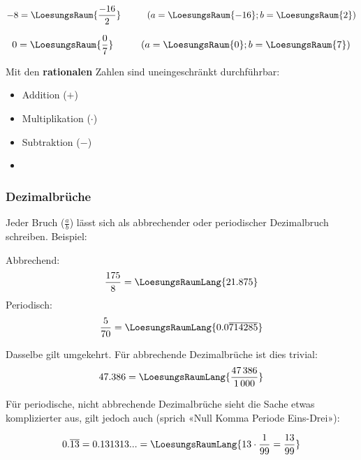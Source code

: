 $$-8 = \LoesungsRaum{\frac{-16}{2}} \hspace{1cm} (a=\LoesungsRaum{-16}; b=\LoesungsRaum{2})$$

$$0 = \LoesungsRaum{\frac{0}{7}} \hspace{1cm} (a=\LoesungsRaum{0}; b=\LoesungsRaum{7})$$


Mit den \textbf{rationalen} Zahlen sind uneingeschränkt durchführbar:
\begin{itemize}
\item Addition ($+$)
\item Multiplikation ($\cdot$)
\item Subtraktion ($-$)
\item {}
\end{itemize}

\newpage


\subsubsection{Dezimalbrüche}
Jeder Bruch ($\frac{a}{b}$) lässt sich als
abbrechender oder periodischer Dezimalbruch schreiben. Beispiel:

Abbrechend:
$$\frac{175}{8} = \LoesungsRaumLang{21.875}$$
Periodisch:
$$\frac{5}{70} = \LoesungsRaumLang{0.0\overline{714285}}$$

Dasselbe gilt umgekehrt. Für abbrechende Dezimalbrüche ist dies
trivial:
$$47.386 = \LoesungsRaumLang{\frac{47\,386}{1\,000}}$$

Für periodische, nicht abbrechende
Dezimalbrüche sieht die Sache etwas komplizierter aus,
gilt jedoch auch (sprich «Null Komma Periode Eins-Drei»):



$$0.\overline{13} = 0.131313... = \LoesungsRaumLang{13\cdot{}\frac1{99}=\frac{13}{99}}$$


\TNTeop{}
